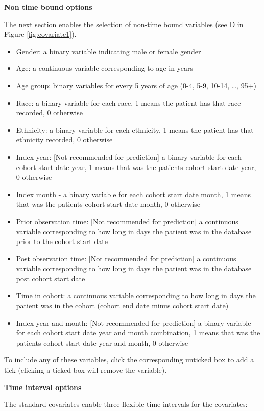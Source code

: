 \documentclass[11pt]{book}
\providecommand{\tightlist}{%
  \setlength{\itemsep}{0pt}\setlength{\parskip}{0pt}}
\theoremstyle{definition}
\theoremstyle{definition}
\theoremstyle{definition}
\theoremstyle{remark}
\begin{document}
\textbf{Non time bound options}

The next section enables the selection of non-time bound variables (see D in Figure \ref{fig:covariate1}).

\begin{itemize}
\tightlist
\item
  Gender: a binary variable indicating male or female gender
\item
  Age: a continuous variable corresponding to age in years
\item
  Age group: binary variables for every 5 years of age (0-4, 5-9, 10-14, \ldots, 95+)
\item
  Race: a binary variable for each race, 1 means the patient has that race recorded, 0 otherwise
\item
  Ethnicity: a binary variable for each ethnicity, 1 means the patient has that ethnicity recorded, 0 otherwise
\item
  Index year: {[}Not recommended for prediction{]} a binary variable for each cohort start date year, 1 means that was the patients cohort start date year, 0 otherwise
\item
  Index month - a binary variable for each cohort start date month, 1 means that was the patients cohort start date month, 0 otherwise
\item
  Prior observation time: {[}Not recommended for prediction{]} a continuous variable corresponding to how long in days the patient was in the database prior to the cohort start date
\item
  Post observation time: {[}Not recommended for prediction{]} a continuous variable corresponding to how long in days the patient was in the database post cohort start date
\item
  Time in cohort: a continuous variable corresponding to how long in days the patient was in the cohort (cohort end date minus cohort start date)
\item
  Index year and month: {[}Not recommended for prediction{]} a binary variable for each cohort start date year and month combination, 1 means that was the patients cohort start date year and month, 0 otherwise
\end{itemize}

To include any of these variables, click the corresponding unticked box to add a tick (clicking a ticked box will remove the variable).

\textbf{Time interval options}

The standard covariates enable three flexible time intervals for the covariates:
\end{document}

